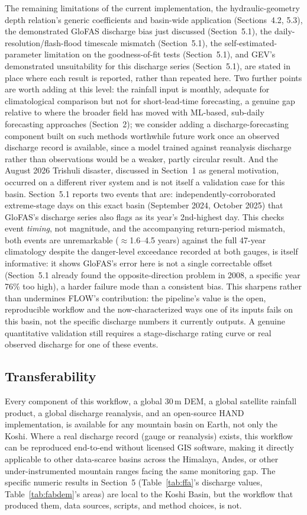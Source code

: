 \documentclass[11pt]{article}
\begin{document}
The remaining limitations of the current implementation, the hydraulic-geometry depth relation's generic coefficients and basin-wide application (Sections~4.2, 5.3), the demonstrated GloFAS discharge bias just discussed (Section~5.1), the daily-resolution/flash-flood timescale mismatch (Section~5.1), the self-estimated-parameter limitation on the goodness-of-fit tests (Section~5.1), and GEV's demonstrated unsuitability for this discharge series (Section~5.1), are stated in place where each result is reported, rather than repeated here. Two further points are worth adding at this level: the rainfall input is monthly, adequate for climatological comparison but not for short-lead-time forecasting, a genuine gap relative to where the broader field has moved with ML-based, sub-daily forecasting approaches (Section~2); we consider adding a discharge-forecasting component built on such methods worthwhile future work once an observed discharge record is available, since a model trained against reanalysis discharge rather than observations would be a weaker, partly circular result. And the August 2026 Trishuli disaster, discussed in Section~1 as general motivation, occurred on a different river system and is not itself a validation case for this basin. Section~5.1 reports two events that are: independently-corroborated extreme-stage days on this exact basin (September 2024, October 2025) that GloFAS's discharge series also flags as its year's 2nd-highest day. This checks event \emph{timing}, not magnitude, and the accompanying return-period mismatch, both events are unremarkable (${\approx}$1.6--4.5 years) against the full 47-year climatology despite the danger-level exceedance recorded at both gauges, is itself informative: it shows GloFAS's error here is not a single correctable offset (Section~5.1 already found the opposite-direction problem in 2008, a specific year 76\% too high), a harder failure mode than a consistent bias. This sharpens rather than undermines FLOW's contribution: the pipeline's value is the open, reproducible workflow and the now-characterized ways one of its inputs fails on this basin, not the specific discharge numbers it currently outputs. A genuine quantitative validation still requires a stage-discharge rating curve or real observed discharge for one of these events.

\subsection{Transferability}

Every component of this workflow, a global 30\,m DEM, a global satellite rainfall product, a global discharge reanalysis, and an open-source HAND implementation, is available for any mountain basin on Earth, not only the Koshi. Where a real discharge record (gauge or reanalysis) exists, this workflow can be reproduced end-to-end without licensed GIS software, making it directly applicable to other data-scarce basins across the Himalaya, Andes, or other under-instrumented mountain ranges facing the same monitoring gap. The specific numeric results in Section~5 (Table~\ref{tab:ffa}'s discharge values, Table~\ref{tab:fabdem}'s areas) are local to the Koshi Basin, but the workflow that produced them, data sources, scripts, and method choices, is not.
\end{document}
